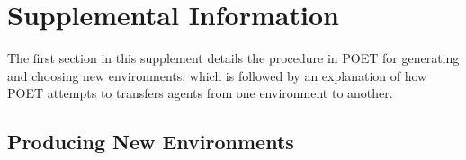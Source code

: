 \documentclass{article}
\newcommand{\ks}[1]{\comments{\textcolor{purple}{[Ken: #1]}}}
\newcommand{\rw}[1]{\comments{\textcolor{blue}{[Rui: #1]}}}
\newcommand{\comments}[1]{#1}
\begin{document}
\newpage
\section{Supplemental Information}\label{supplemental}

The first section in this supplement details the procedure in POET for generating and choosing new environments, which is followed by an explanation of how POET attempts to transfers agents from one environment to another.

\subsection{Producing New Environments}\label{mutation_section}



\end{document}
